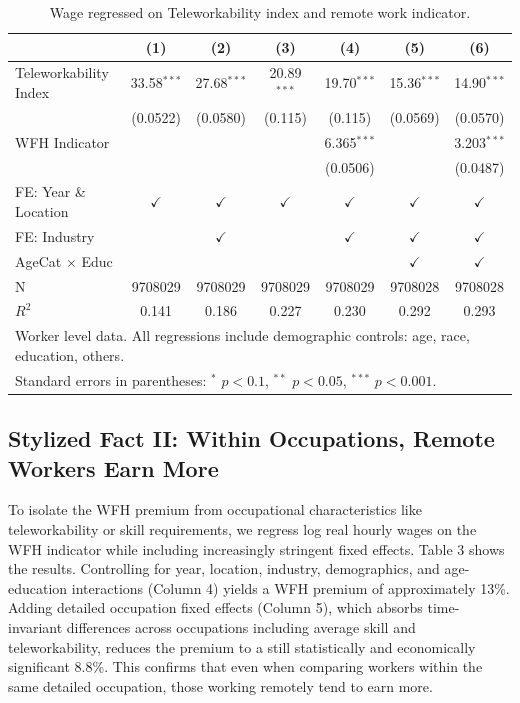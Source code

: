 \documentclass[
  11pt,
  letterpaper,
  DIV=11,
  numbers=noendperiod]{scrartcl}
\newcommand{\sym}[1]{\ensuremath{^{#1}}}
\theoremstyle{plain}
\theoremstyle{remark}
\begin{document}
\begin{table}[htbp]

\centering
\footnotesize
\caption{Wage regressed on Teleworkability index and remote work indicator.}
\begin{tabular}{l c c c c c c}
\hline \hline
&\multicolumn{1}{c}{(1)} &\multicolumn{1}{c}{(2)} &\multicolumn{1}{c}{(3)} &\multicolumn{1}{c}{(4)} &\multicolumn{1}{c}{(5)} &\multicolumn{1}{c}{(6)} \\
\hline
Teleworkability Index & 33.58\sym{***}& 27.68\sym{***}& 20.89\sym{***}& 19.70\sym{***}& 15.36\sym{***}& 14.90\sym{***}\\
& (0.0522) & (0.0580) & (0.115) & (0.115) & (0.0569) & (0.0570) \\
WFH Indicator & & & & 6.365\sym{***}& & 3.203\sym{***}\\
& & & & (0.0506) & & (0.0487) \\
\hline
FE: Year \& Location & $\checkmark$ & $\checkmark$ & $\checkmark$ & $\checkmark$ & $\checkmark$ & $\checkmark$ \\
FE: Industry & & $\checkmark$ & & $\checkmark$ & $\checkmark$ & $\checkmark$ \\
AgeCat $\times$ Educ & & & & & $\checkmark$ & $\checkmark$ \\
\hline
N & 9708029 & 9708029 & 9708029 & 9708029 & 9708028 & 9708028 \\
$R^2$ & 0.141 & 0.186 & 0.227 & 0.230 & 0.292 & 0.293 \\
\hline\hline
\multicolumn{7}{l}{\footnotesize Worker level data. All regressions include demographic controls: age, race, education, others.}\\
\multicolumn{7}{l}{\footnotesize Standard errors in parentheses: \sym{*} \(p<0.1\), \sym{**} \(p<0.05\), \sym{***} \(p<0.001\).}\\
\end{tabular}
\end{table}

\subsection{Stylized Fact II: Within Occupations, Remote Workers Earn
More}\label{stylized-fact-ii-within-occupations-remote-workers-earn-more}

To isolate the WFH premium from occupational characteristics like
teleworkability or skill requirements, we regress log real hourly wages
on the WFH indicator while including increasingly stringent fixed
effects. Table 3 shows the results. Controlling for year, location,
industry, demographics, and age-education interactions (Column 4) yields
a WFH premium of approximately 13\%. Adding detailed occupation fixed
effects (Column 5), which absorbs time-invariant differences across
occupations including average skill and teleworkability, reduces the
premium to a still statistically and economically significant 8.8\%.
This confirms that even when comparing workers within the same detailed
occupation, those working remotely tend to earn more.
\end{document}
